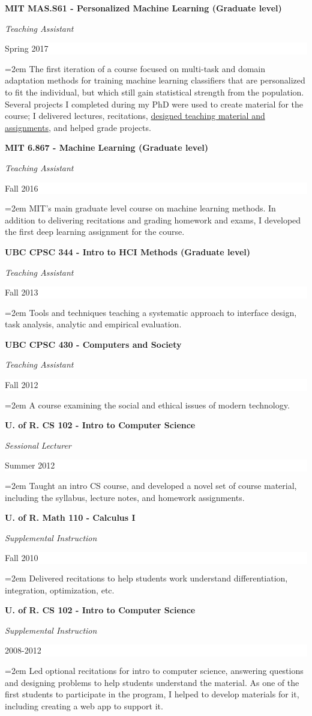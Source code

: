 \documentclass[paper=letter,fontsize=11pt]{scrartcl} %
\newcommand{\sepspace}{\vspace*{1em}}		%
\newcommand{\CourseEntry}[4]{
		\noindent \textbf{#1} \par
		\noindent \textit{#3} \hfill      %
		\colorbox{White}{%
			\parbox{6em}{%
			\hfill\color{Black}#2}} \par  %
		\noindent\hangindent=2em\hangafter=0 \small #4 %
		\normalsize \par}
\begin{document}
\CourseEntry{MIT MAS.S61 - Personalized Machine Learning (Graduate level)}{Spring 2017}{Teaching Assistant}
{The first iteration of a course focused on multi-task and domain adaptation methods for training machine learning classifiers that are personalized to fit the individual, but which still gain statistical strength from the population. Several projects I completed during my PhD were used to create material for the course; I delivered lectures, recitations, \href{https://github.com/natashamjaques/PersonalizedML}{designed teaching material and assignments}, and helped grade projects.}
\sepspace

\CourseEntry{MIT 6.867 - Machine Learning (Graduate level)}{Fall 2016}{Teaching Assistant}
{MIT's main graduate level course on machine learning methods. In addition to delivering recitations and grading homework and exams, I developed the first deep learning assignment for the course.}
\sepspace

\CourseEntry{UBC CPSC 344 - Intro to HCI Methods (Graduate level)}{Fall 2013}{Teaching Assistant}
{Tools and techniques teaching a systematic approach to interface design, task analysis, analytic and empirical evaluation.}
\sepspace

\CourseEntry{UBC CPSC 430 - Computers and Society}{Fall 2012}{Teaching Assistant}
{A course examining the social and ethical issues of modern technology.}
\sepspace

\CourseEntry{U. of R. CS 102 - Intro to Computer Science}{Summer 2012}{Sessional Lecturer}
{Taught an intro CS course, and developed a novel set of course material, including the syllabus, lecture notes, and homework assignments.}
\sepspace

\CourseEntry{U. of R. Math 110 - Calculus I}{Fall 2010}{Supplemental Instruction}
{Delivered recitations to help students work understand differentiation, integration, optimization, etc.}
\sepspace

\CourseEntry{U. of R. CS 102 - Intro to Computer Science}{2008-2012}{Supplemental Instruction}
{Led optional recitations for intro to computer science, answering questions and designing problems to help students understand the material. As one of the first students to participate in the program, I helped to develop materials for it, including creating a web app to support it.}
\end{document}
